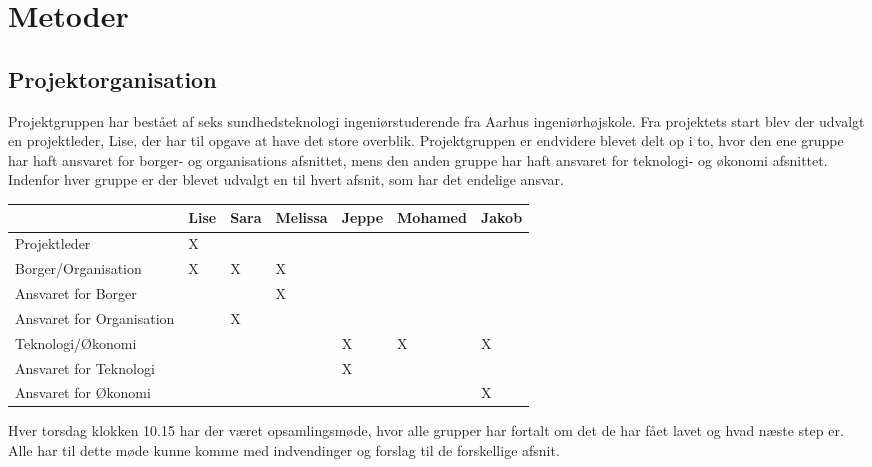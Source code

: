 \chapter{Metoder}

\section{Projektorganisation}
Projektgruppen har bestået af seks sundhedsteknologi ingeniørstuderende fra Aarhus ingeniørhøjskole. Fra projektets start blev der udvalgt en projektleder, Lise, der har til opgave at have det store overblik. Projektgruppen er endvidere blevet delt op i to, hvor den ene gruppe har haft ansvaret for borger- og organisations afsnittet, mens den anden gruppe har haft ansvaret for teknologi- og økonomi afsnittet. Indenfor hver gruppe er der blevet udvalgt en til hvert afsnit, som har det endelige ansvar. 


\begin{table}[h]
\begin{tabular}{lllllll}
& Lise & Sara & Melissa &Jeppe &Mohamed & Jakob\\
\midrule
Projektleder &  X & & & & &\\
\midrule
Borger/Organisation &X & X & X & & &\\
Ansvaret for Borger & &  & X& & &\\
Ansvaret for Organisation & & X&  & & &\\
\midrule
Teknologi/Økonomi & & & & X &  X & X\\
Ansvaret for Teknologi & & & & X & &\\
Ansvaret for Økonomi & & & & & &X\\

\end{tabular}
\end{table} 

Hver torsdag klokken 10.15 har der været opsamlingsmøde, hvor alle grupper har fortalt om det de har fået lavet og hvad næste step er. Alle har til dette møde kunne komme med indvendinger og forslag til de forskellige afsnit.   
	

